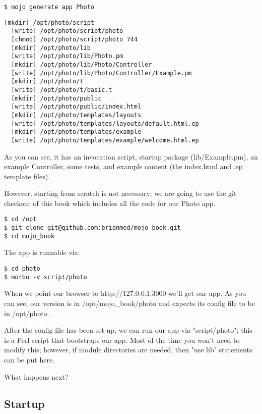 \documentclass[14pt]{extreport}
\begin{document}
\begin{lstlisting}[style=BashInputStyle]
$ mojo generate app Photo
\end{lstlisting}

\begin{lstlisting}[style=BashOutputStyle]
  [mkdir] /opt/photo/script
  [write] /opt/photo/script/photo
  [chmod] /opt/photo/script/photo 744
  [mkdir] /opt/photo/lib
  [write] /opt/photo/lib/Photo.pm
  [mkdir] /opt/photo/lib/Photo/Controller
  [write] /opt/photo/lib/Photo/Controller/Example.pm
  [mkdir] /opt/photo/t
  [write] /opt/photo/t/basic.t
  [mkdir] /opt/photo/public
  [write] /opt/photo/public/index.html
  [mkdir] /opt/photo/templates/layouts
  [write] /opt/photo/templates/layouts/default.html.ep
  [mkdir] /opt/photo/templates/example
  [write] /opt/photo/templates/example/welcome.html.ep
\end{lstlisting}

As you can see, it has an invocation script, startup package (lib/Example.pm),
an example Controller, some tests, and example content (the index.html and .ep
template files).

However, starting from scratch is not necessary; we are going to use the git
checkout of this book which includes all the code for our Photo app.

\begin{lstlisting}[style=BashOutputStyle]
$ cd /opt
$ git clone git@github.com:brianmed/mojo_book.git
$ cd mojo_book
\end{lstlisting}

The app is runnable via:

\begin{lstlisting}[style=BashInputStyle]
$ cd photo
$ morbo -v script/photo
\end{lstlisting}

When we point our browser to http://127.0.0.1:3000 we'll get our app.  As you
can see, our version is in /opt/mojo\_book/photo and expects its config file to
be in /opt/photo.

After the config file has been set up, we can run our app via "script/photo";
this is a Perl script that bootstraps our app.  Most of the time you won't need
to modify this; however, if module directories are needed, then "use lib" statements
can be put here.

What happens next?

\subsection{Startup}
\end{document}
